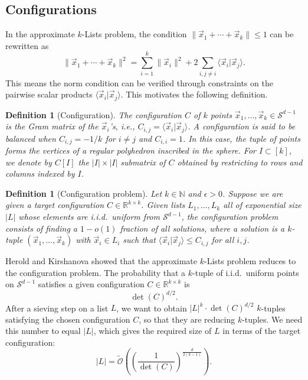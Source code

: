 \documentclass[10pt,a4paper]{article}
\newtheorem{definition}[theorem]{Definition}
\begin{document}
\subsection{Configurations}
\label{sec:configurations}

In the approximate \(k\)-Lists problem, the condition \(\|\vec{x}_1+\cdots+\vec{x}_k\|\le 1\) can be rewritten as
\begin{equation}
\|\vec{x}_1+\cdots+\vec{x}_k\|^2 = \sum_{i=1}^{k}\|\vec{x}_i\|^2 + 2\sum_{i,j\neq i}\langle\vec{x}_i|\vec{x}_j\rangle.
\end{equation}
This means the norm condition can be verified through constraints on the pairwise scalar products \(\langle\vec{x}_i|\vec{x}_j\rangle\). This motivates the following definition.

\begin{definition}[Configuration]
The configuration \(C\) of \(k\) points \(\vec{x}_1,\ldots,\vec{x}_k\in\mathcal{S}^{d-1}\) is the Gram matrix of the \(\vec{x}_i\)'s, i.e., \(C_{i,j}=\langle\vec{x}_i|\vec{x}_j\rangle\). A configuration is said to be \emph{balanced} when \(C_{i,j}=-1/k\) for \(i\neq j\) and \(C_{i,i}=1\). In this case, the tuple of points forms the vertices of a regular polyhedron inscribed in the sphere. For \(I\subset[k]\), we denote by \(C[I]\) the \(|I|\times|I|\) submatrix of \(C\) obtained by restricting to rows and columns indexed by \(I\).
\end{definition}

\begin{definition}[Configuration problem]
Let \(k\in\mathbb{N}\) and \(\epsilon>0\). Suppose we are given a target configuration \(C\in\mathbb{R}^{k\times k}\). Given lists \(L_1,\ldots,L_k\) all of exponential size \(|L|\) whose elements are i.i.d.\ uniform from \(\mathcal{S}^{d-1}\), the configuration problem consists of finding a \(1-o(1)\) fraction of all solutions, where a solution is a \(k\)-tuple \((\vec{x}_1,\ldots,\vec{x}_k)\) with \(\vec{x}_i\in L_i\) such that \(\langle\vec{x}_i|\vec{x}_j\rangle\le C_{i,j}\) for all \(i,j\).
\end{definition}

Herold and Kirshanova showed that the approximate \(k\)-Lists problem reduces to the configuration problem. The probability that a \(k\)-tuple of i.i.d.\ uniform points on \(\mathcal{S}^{d-1}\) satisfies a given configuration \(C\in\mathbb{R}^{k\times k}\) is
\begin{equation}
\det(C)^{d/2}.
\end{equation}
After a sieving step on a list \(L\), we want to obtain \(|L|^k\cdot\det(C)^{d/2}\) \(k\)-tuples satisfying the chosen configuration \(C\), so that they are reducing \(k\)-tuples. We need this number to equal \(|L|\), which gives the required size of \(L\) in terms of the target configuration:
\begin{equation}
|L| = \tilde{\mathcal{O}}\!\left(\left(\frac{1}{\det(C)}\right)^{\frac{d}{2(k-1)}}\right).
\label{eq:list-size}
\end{equation}
\end{document}
